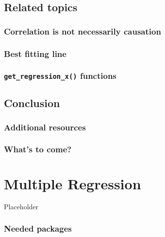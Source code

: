 \documentclass[12pt, krantz2,]{krantz}
\begin{document}
\hypertarget{related-topics}{%
\section{Related topics}\label{related-topics}}

\hypertarget{correlation-is-not-causation}{%
\subsection{Correlation is not necessarily causation}\label{correlation-is-not-causation}}

\hypertarget{leastsquares}{%
\subsection{Best fitting line}\label{leastsquares}}

\hypertarget{underthehood}{%
\subsection{\texorpdfstring{\texttt{get\_regression\_x()} functions}{get\_regression\_x() functions}}\label{underthehood}}

\hypertarget{conclusion-4}{%
\section{Conclusion}\label{conclusion-4}}

\hypertarget{additional-resources-basic-regression}{%
\subsection{Additional resources}\label{additional-resources-basic-regression}}

\hypertarget{whats-to-come-4}{%
\subsection{What's to come?}\label{whats-to-come-4}}

\hypertarget{multiple-regression}{%
\chapter{Multiple Regression}\label{multiple-regression}}

Placeholder

\hypertarget{needed-packages-4}{%
\subsection*{Needed packages}\label{needed-packages-4}}
\end{document}
